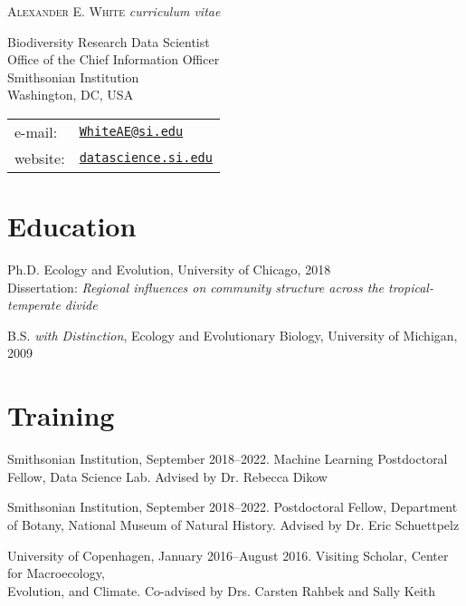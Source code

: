 \documentclass[letterpaper]{article}
\def\name{Alexander E. White}
\renewenvironment{itemize}{
  \begin{list}{}{
    \setlength{\leftmargin}{1.5em}
  }
}{
  \end{list}
}
\newenvironment{biblist}{%
   \begin{list}{}{%
     \setlength{\labelwidth}{0pt}%
     \setlength{\labelsep}{1em}%
     \setlength{\leftmargin}{2em}%
     \setlength{\itemindent}{-1em}%
   }
}{\end{list}}
\begin{document}
{\LARGE \scshape \name}
{\emph{curriculum vitae}}

\vspace{0.25in}

\begin{minipage}{0.55\linewidth}
Biodiversity Research Data Scientist \\
Office of the Chief Information Officer \\
Smithsonian Institution\\
Washington, DC, USA
\end{minipage}
\begin{minipage}{0.45\linewidth}
  \begin{tabular}{ll}
    e-mail: & \href{mailto:whiteae@si.edu}{\tt WhiteAE@si.edu} \\
    website: &\href{https://sidatasciencelab.github.io/people/leads/alex.html}{\tt datascience.si.edu}
  \end{tabular}
\end{minipage}

\section*{Education}

\begin{itemize}
  \item Ph.D. Ecology and Evolution, University of Chicago, 2018
  \\Dissertation: \emph{Regional influences on community structure across the tropical-temperate divide}

  \item B.S. \emph{with Distinction}, Ecology and Evolutionary Biology, University of Michigan, 2009
\end{itemize}

\section*{Training}

\begin{biblist}
\item Smithsonian Institution, September 2018--2022. Machine Learning Postdoctoral Fellow, Data Science Lab. Advised by Dr. Rebecca Dikow 
\item Smithsonian Institution, September 2018--2022. Postdoctoral Fellow, Department of Botany, National Museum of Natural History. Advised by Dr. Eric Schuettpelz
\item University of Copenhagen, January 2016--August 2016. Visiting Scholar, Center for Macroecology, 
\\Evolution, and Climate. Co-advised by Drs. Carsten Rahbek and Sally Keith
\end{biblist}
\end{document}

